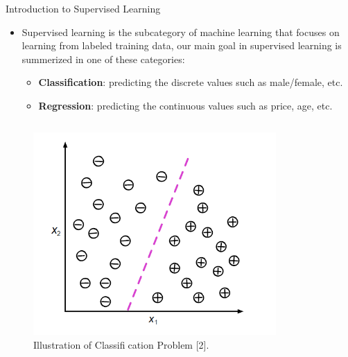 \documentclass[compress,oilve]{beamer}
\begin{document}
\begin{frame}{Introduction to Supervised Learning}
\begin{itemize}
\item Supervised learning is the subcategory of machine learning that focuses on learning from labeled training data, our main goal in supervised learning is summerized in one of these categories:
\begin{itemize}
\item \textbf{Classification}: predicting the discrete values such as male/female, etc.
\item \textbf{Regression}: predicting the continuous values such as price, age, etc.
\end{itemize}
\end{itemize}
\begin{columns}
\begin{column}{0.5\textwidth}
\begin{figure}
 \centering
 \includegraphics[scale=0.5]{10}  
 \caption{Illustration of Classification Problem [2].}
\end{figure}
\end{column}
\begin{column}{0.5\textwidth}
\begin{figure}
 \centering

\end{figure}
\end{column}
\end{columns}
\end{frame}
\end{document}
